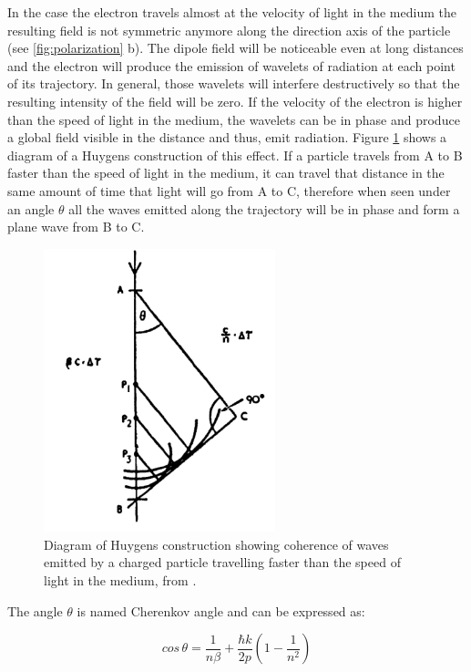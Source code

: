 \documentclass[main.tex]{subfiles}
\begin{document}
In the case the electron travels almost at the velocity of light in the medium the resulting field is not symmetric anymore along the direction axis of the particle (see \ref{fig:polarization} b). The dipole field will be noticeable even at long distances and the electron will produce the emission of wavelets of radiation at each point of its trajectory. In general, those wavelets will interfere destructively so that the resulting intensity of the field will be zero. If the velocity of the electron is higher than the speed of light in the medium, the wavelets can be in phase and produce a global field visible in the distance and thus, emit radiation. Figure \ref{fig:huygens} shows a diagram of a Huygens construction of this effect. If a particle travels from A to B faster than the speed of light in the medium, it can travel that distance in the same amount of time that light will go from A to C, therefore when seen under an angle $\theta$ all the waves emitted along the trajectory will be in phase and form a plane wave from B to C. 

\begin{figure}
    \centering
    \includegraphics[width=0.6\textwidth]{Pictures/huygenscoherence.pdf}
    \caption{Diagram of Huygens construction showing coherence of waves emitted by a charged particle travelling faster than the speed of light in the medium, from \cite{jelley1958Cherenkov}.}
    \label{fig:huygens}
\end{figure}

The angle $\theta$ is named Cherenkov angle and can be expressed as:

\begin{equation}
    cos\,\theta = \frac{1}{n\beta} + \frac{\hbar k}{2p} \left( 1-\frac{1}{n^2}\right)
\end{equation}
\end{document}
